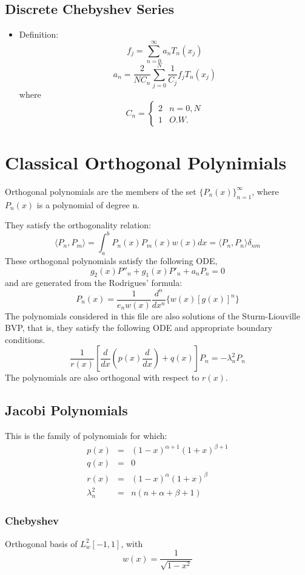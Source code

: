 \documentclass[oneside,a4paper,11pt]{article}
\begin{document}
\subsection{Discrete Chebyshev Series}
\begin{itemize}
\item Definition:
\[f_j=\sum_{n=0}^{\infty}a_nT_n(x_j)\]
\[a_n=\frac{2}{NC_n}\sum_{j=0}^{N}\frac{1}{C_j}f_jT_n(x_j)\]
where
\[ C_n = \left\{ \begin{array}{cc}  2 & n=0,N\\ 1 & O.W. \end{array}\right.\]
\end{itemize}

\section{Classical Orthogonal Polynimials}
Orthogonal polynomials are the members of the set $\{P_n(x)\}_{n=1}^{\infty}$, where $P_n(x)$ is a polynomial of degree n.

They satisfy the orthogonality relation:
\[\langle P_n,P_m \rangle = \int_a^b P_n(x)P_m(x)w(x)dx  = \langle P_n,P_n \rangle \delta_{nm}\]
These orthogonal polynomials satisfy the following ODE,
\[g_2(x) P''_n + g_1(x)P'_n + a_nP_n = 0\]
and are generated from the Rodrigues' formula:
\[P_n(x) = \frac{1}{e_nw(x)}\frac{d^n}{dx^n}\{w(x)[g(x)]^n\}\]
The polynomials considered in this file are also solutions of the Sturm-Liouville BVP, that is, they satisfy the following ODE and appropriate boundary conditions.
\[ \frac{1}{r(x)}\left[\frac{d}{dx}\left(p(x)\frac{d}{dx}\right)+q(x)\right]P_n = - \lambda_n^2P_n\]
The polynomials are also orthogonal with respect to $r(x)$.

\subsection{Jacobi Polynomials}
This is the family of polynomials for which:
\begin{eqnarray*}
p(x) &=& (1 - x)^{\alpha + 1}(1+x)^{\beta + 1}\\
q(x) &=& 0\\
r(x) &=& (1 - x)^\alpha(1+x)^\beta \\
\lambda_n^2 &=& n(n + \alpha + \beta + 1)
\end{eqnarray*}

\subsubsection{Chebyshev}
Orthogonal basis of $L^2_w[-1,1]$, with
\[w(x) = \frac{1}{\sqrt{1 - x^2}}\] 
\end{document}
